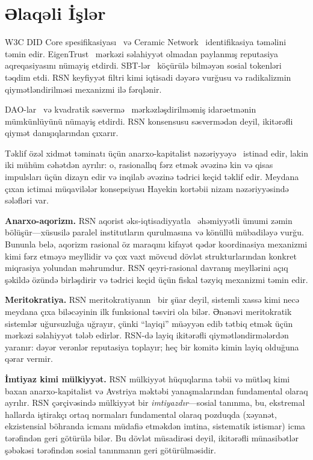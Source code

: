 \documentclass[11pt,a4paper,twocolumn]{article}
\begin{document}
\section{Əlaqəli İşlər}

W3C DID Core spesifikasiyası~\cite{did2022} və Ceramic Network~\cite{ceramic2023} identifikasiya təməlini təmin edir. EigenTrust~\cite{kamvar2003} mərkəzi səlahiyyət olmadan paylanmış reputasiya aqreqasiyasını nümayiş etdirdi. SBT-lər~\cite{weyl2022} köçürülə bilməyən sosial tokenləri təqdim etdi. RSN keyfiyyət filtri kimi iqtisadi dəyərə vurğusu və radikalizmin qiymətləndirilməsi mexanizmi ilə fərqlənir.

DAO-lar~\cite{buterin2014} və kvadratik səsvermə~\cite{buterin2019} mərkəzləşdirilməmiş idarəetmənin mümkünlüyünü nümayiş etdirdi. RSN konsensusu səsvermədən deyil, ikitərəfli qiymət danışıqlarından çıxarır.

Təklif özəl xidmət təminatı üçün anarxo-kapitalist nəzəriyyəyə~\cite{rothbard1973,hoppe2001} istinad edir, lakin iki mühüm cəhətdən ayrılır: o, rasionallıq fərz etmək əvəzinə kin və qisas impulsları üçün dizayn edir və inqilab əvəzinə tədrici keçid təklif edir. Meydana çıxan ictimai müqavilələr konsepsiyası Hayekin kortəbii nizam nəzəriyyəsində~\cite{hayek1973} sələfləri var.

\textbf{Anarxo-aqorizm.} RSN aqorist əks-iqtisadiyyatla~\cite{konkin2006} əhəmiyyətli ümumi zəmin bölüşür---xüsusilə paralel institutların qurulmasına və könüllü mübadiləyə vurğu. Bununla belə, aqorizm rasional öz maraqını kifayət qədər koordinasiya mexanizmi kimi fərz etməyə meyllidir və çox vaxt mövcud dövlət strukturlarından konkret miqrasiya yolundan məhrumdur. RSN qeyri-rasional davranış meyllərini açıq şəkildə özündə birləşdirir və tədrici keçid üçün fiskal təzyiq mexanizmi təmin edir.

\textbf{Meritokratiya.} RSN meritokratiyanın~\cite{young1958} bir şüar deyil, sistemli xassə kimi necə meydana çıxa biləcəyinin ilk funksional təsviri ola bilər. Ənənəvi meritokratik sistemlər uğursuzluğa uğrayır, çünki ``layiqi'' müəyyən edib tətbiq etmək üçün mərkəzi səlahiyyət tələb edirlər. RSN-də layiq ikitərəfli qiymətləndirmələrdən yaranır: dəyər verənlər reputasiya toplayır; heç bir komitə kimin layiq olduğuna qərar vermir.

\textbf{İmtiyaz kimi mülkiyyət.} RSN mülkiyyət hüquqlarına təbii və mütləq kimi baxan anarxo-kapitalist və Avstriya məktəbi yanaşmalarından fundamental olaraq ayrılır. RSN çərçivəsində mülkiyyət bir \emph{imtiyazdır}---sosial tanınma, bu, ekstremal hallarda iştirakçı ortaq normaları fundamental olaraq pozduqda (xəyanət, ekzistensial böhranda icmanı müdafiə etməkdən imtina, sistematik istismar) icma tərəfindən geri götürülə bilər. Bu dövlət müsadirəsi deyil, ikitərəfli münasibətlər şəbəkəsi tərəfindən sosial tanınmanın geri götürülməsidir.
\end{document}
